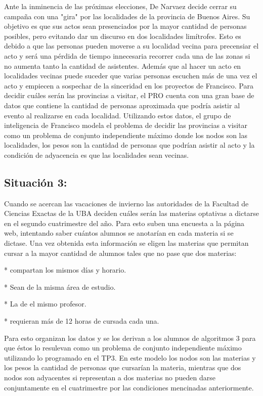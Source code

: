 \documentclass[a4paper,11pt] {article}
\begin{document}
Ante la inminencia de las próximas elecciones, De Narvaez decide cerrar su campaña con una "gira" por las localidades de la provincia de Buenos Aires. Su objetivo es que sus actos sean presenciados por la mayor cantidad de personas posibles, pero evitando dar un discurso
en dos localidades limítrofes. Esto es debido a que las personas pueden moverse a su localidad vecina para precensiar el acto y será una pérdida de tiempo innecesaria recorrer cada una de las zonas si no aumenta tanto la cantidad de asistentes. 
Además que al hacer un acto en localidades vecinas puede suceder que varias personas escuchen más de una vez el acto y empiecen a sospechar de la sinceridad en los proyectos de Francisco.
Para decidir cuáles serán las provincias a visitar, el PRO cuenta con una gran base de datos que contiene la cantidad de personas aproximada que podría asistir al evento al realizarse en cada localidad. Utilizando estos datos, el grupo de inteligencia de Francisco
modela el problema de decidir las provincias a visitar como un problema de conjunto independiente máximo donde los nodos son las localidades, los pesos son la cantidad de personas que podrían asistir al acto y la condición de adyacencia es que las localidades sean vecinas.
	
\subsection*{Situación 3:}

Cuando se acercan las vacaciones de invierno las autoridades de la Facultad de Ciencias Exactas de la UBA deciden cuáles serán las materias optativas a dictarse en el segundo cuatrimestre del año.
Para esto suben una encuesta a la página web, intentando saber cuántos alumnos se anotarían en cada materia si se dictase. Una vez obtenida esta información se eligen las materias que permitan cursar a la mayor cantidad de alumnos tales que no pase que dos materias:

	*	compartan los mismos días y horario.

	*	Sean de la misma área de estudio.

	*	La de el mismo profesor.

	*	requieran más de 12 horas de cursada cada una.

Para esto organizan los datos y se los derivan a los alumnos de algoritmos 3 para que éstos lo resulevan como un problema de conjunto independiente máximo utilizando lo programado en el TP3.
En este modelo los nodos son las materias y los pesos la cantidad de personas que cursarían la materia, mientras que dos nodos son adyacentes si representan a dos materias no pueden darse conjuntamente en el cuatrimestre por las condiciones mencinadas anteriormente.
\end{document}
